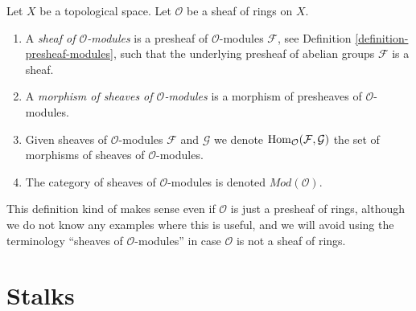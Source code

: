 \begin{definition}
\label{definition-sheaf-modules}
\begin{reference}
\cite[Chapter I, \S 1, no. 6, pp. 202--203, and Chapter II,
\S 2, no. 38, p. 231]{FAC}
\end{reference}
Let $X$ be a topological space.
Let $\mathcal{O}$ be a sheaf of rings on $X$.
\begin{enumerate}
\item A {\it sheaf of $\mathcal{O}$-modules} is a presheaf
of $\mathcal{O}$-modules $\mathcal{F}$,
see Definition \ref{definition-presheaf-modules},
such that the underlying presheaf of abelian groups $\mathcal{F}$
is a sheaf.
\item A {\it morphism of sheaves of $\mathcal{O}$-modules}
is a morphism of presheaves of $\mathcal{O}$-modules.
\item Given sheaves of $\mathcal{O}$-modules
$\mathcal{F}$ and $\mathcal{G}$ we denote
$\mathop{\mathrm{Hom}}\nolimits_\mathcal{O}(\mathcal{F}, \mathcal{G})$
the set of morphisms of sheaves of $\mathcal{O}$-modules.
\item The category of sheaves of $\mathcal{O}$-modules
is denoted $\textit{Mod}(\mathcal{O})$.
\end{enumerate}
\end{definition}

\noindent
This definition kind of makes sense even if $\mathcal{O}$ is just a
presheaf of rings, although we do not know any examples where
this is useful, and we will avoid using the terminology
``sheaves of $\mathcal{O}$-modules''
in case $\mathcal{O}$ is not a sheaf of rings.







\section{Stalks}
\label{section-stalks}

